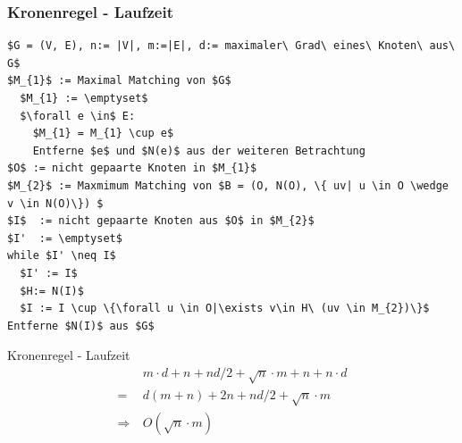 \documentclass{beamer}
\begin{document}
\begin{frame}[fragile]
\frametitle{Kronenregel - Laufzeit}
\begin{lstlisting}[mathescape=true, escapechar = !,basicstyle=\ttfamily\scriptsize]
$G = (V, E), n:= |V|, m:=|E|, d:= maximaler\ Grad\ eines\ Knoten\ aus\ G$
$M_{1}$ := Maximal Matching von $G$
  $M_{1} := \emptyset$
  $\forall e \in$ E:
    $M_{1} = M_{1} \cup e$
    Entferne $e$ und $N(e)$ aus der weiteren Betrachtung
$O$ := nicht gepaarte Knoten in $M_{1}$
$M_{2}$ := Maxmimum Matching von $B = (O, N(O), \{ uv| u \in O \wedge v \in N(O)\}) $
$I$  := nicht gepaarte Knoten aus $O$ in $M_{2}$
$I'  := \emptyset$
while $I' \neq I$
  $I' := I$
  $H:= N(I)$
  $I := I \cup \{\forall u \in O|\exists v\in H\ (uv \in M_{2})\}$
Entferne $N(I)$ aus $G$
\end{lstlisting}
\end{frame}
\begin{frame}{Kronenregel - Laufzeit}
\begin{align*}
&\ m \cdot d + n + n d/2 + \sqrt{n} \cdot m + n  + n \cdot d \\  
=&\ d (m+n) +2 n + nd/2 + \sqrt{n} \cdot m \\  
\Rightarrow &\ O(\sqrt{n} \cdot m)
\end{align*}
\end{frame}
\end{document}
